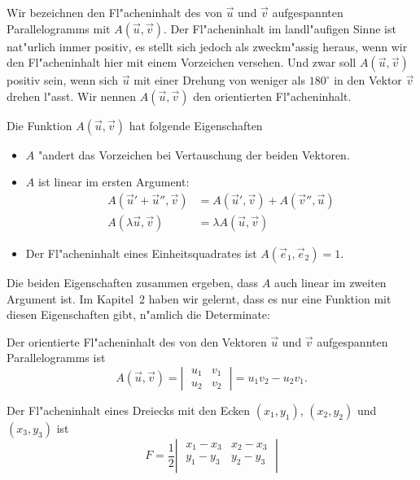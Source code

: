 Wir bezeichnen den Fl"acheninhalt des von $\vec u$ und $\vec v$ aufgespannten
Parallelogramms mit $A(\vec u,\vec v)$. Der Fl"acheninhalt im landl"aufigen
Sinne ist nat"urlich immer positiv, es stellt sich jedoch als
zweckm"assig heraus, wenn wir den Fl"acheninhalt hier mit einem 
Vorzeichen versehen. Und zwar soll $A(\vec u,\vec v)$ positiv sein, wenn
sich $\vec u$ mit einer Drehung von weniger als $180^\circ$ in den Vektor
$\vec v$ drehen l"asst. Wir nennen $A(\vec u, \vec v)$ den orientierten
Fl"acheninhalt.

Die Funktion $A(\vec u,\vec v)$ hat folgende Eigenschaften
\begin{itemize}
\item $A$ "andert das Vorzeichen bei Vertauschung der beiden Vektoren.
\item $A$ ist linear im ersten Argument: 
\begin{align*}
A(\vec u'+\vec u'',\vec v)&=A(\vec u',\vec v)+A(\vec v'',\vec u)
\\
A(\lambda \vec u,\vec v)&=\lambda A(\vec u,\vec v)
\end{align*}
\item Der Fl"acheninhalt eines Einheitsquadrates ist $A(\vec e_1,\vec e_2)=1$.
\end{itemize}
Die beiden Eigenschaften zusammen ergeben, dass $A$ auch linear im 
zweiten Argument ist. Im Kapitel~2 haben wir gelernt, dass es nur eine
Funktion mit diesen Eigenschaften gibt, n"amlich die Determinate:
\begin{satz}
Der orientierte Fl"acheninhalt des von den Vektoren $\vec u$ und $\vec v$
aufgespannten Parallelogramms ist
\[
A(\vec u,\vec v)=\left|\;\begin{matrix}u_1&v_1\\u_2&v_2\end{matrix}\;\right|
=u_1v_2-u_2v_1
.
\]
\end{satz}
\begin{satz}
Der Fl"acheninhalt eines Dreiecks mit den Ecken $(x_1,y_1)$, $(x_2,y_2)$ und
$(x_3,y_3)$ ist
\[
F=
\frac12\left|\;
\begin{matrix}
x_1-x_3&x_2-x_3\\
y_1-y_3&y_2-y_3\\
\end{matrix}
\;\right|
\]
\end{satz}

